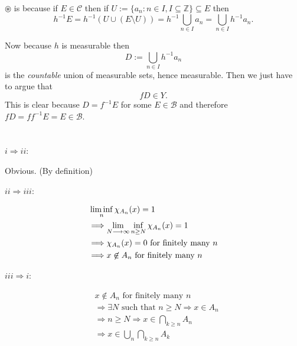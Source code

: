 \documentclass{unswmaths}
\begin{document}
$ \circledast $ is because if $ E \in \mathcal{C} $ then if $ U := \{ a_n  : n \in I, I \subseteq \mathbb{Z} \} \subseteq E $ then 
$$ h^{-1} E = h^{-1} \left(U \cup \left(E \setminus U \right)\right) = h^{-1} \bigcup_{n\in I} a_n = \bigcup_{n \in I} h^{-1} a_n. $$

Now because $ h $ is measurable then 
$$
    D := \bigcup_{n \in I} h^{-1}a_n
$$
is the \emph{countable} union of measurable sets, hence measurable.
Then we just have to argue that
$$
    fD \in Y.
$$
This is clear because $ D = f^{-1} E $ for some $ E \in \mathcal{B} $ and therefore $ fD = ff^{-1}E = E \in \mathcal{B} $.


\section{}
\subsection{}
$ i \Longrightarrow ii $:

Obvious. (By definition)

$ ii \Longrightarrow iii $:

\begin{align*}
    & \liminf_{n}\chi_{A_n}(x) = 1 \\
    &\Longrightarrow  \lim_{N\longrightarrow\infty} \inf_{n \geq N} \chi_{A_n}(x) = 1\\
    &\Longrightarrow  \chi_{A_n}(x) = 0 \text{ for finitely many } n \\ 
    &\Longrightarrow x \not\in A_n \text{ for finitely many } n 
\end{align*}
 
$ iii \Longrightarrow i $:

\begin{align*}
    & x \not\in A_n \text{ for finitely many } n \\
    & \Longrightarrow \exists N \text{ such that } n \geq N \Longrightarrow x \in A_{n} \\
    & \Longrightarrow n\geq N \Longrightarrow x \in \bigcap_{k\geq n} A_n \\
    & \Longrightarrow x \in \bigcup_{n} \bigcap_{k\geq n} A_{k} \\
\end{align*}

\subsection{}
\end{document}
